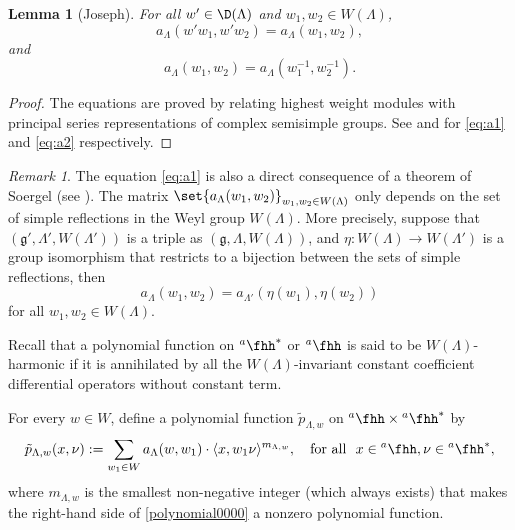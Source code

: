 \documentclass[12pt]{amsart}
\newcommand{\CH}{{\mathcal {H}}}
\newcommand{\g}{\mathfrak g}
\newcommand{\la}{\langle}
\newcommand{\ra}{\rangle}
\newcommand{\be}{\begin {equation}}
\newcommand{\ee}{\end {equation}}
\numberwithin{equation}{section}
\newtheorem{lem}[thm]{Lemma}
\theoremstyle{remark}
\newtheorem{remark}[thm]{Remark}
\def\hha{{}^a\fhh}
\begin{document}
\begin{lem}[Joseph] \label{wprime0}
For all  $w'\in \D(\Lambda)$ and $w_1, w_2\in W(\Lambda)$,
\begin{equation}\label{eq:a1}
a_{\Lambda}(w'w_1, w'w_2)= a_{\Lambda}(w_1, w_2),
\end{equation}
and
\begin{equation}\label{eq:a2}
    a_{\Lambda}(w_1,w_2) = a_{\Lambda}(w_1^{-1}, w_2^{-1}).
\end{equation}
\end{lem}
\begin{proof}
  The equations are  proved by relating highest weight modules with principal series representations of complex semisimple groups.
  See \cite[Theorem~4.12 and Theorem~5.4]{J79D} and \cite[Corollary~3.3]{J79W} for  \eqref{eq:a1} and \eqref{eq:a2} respectively.
\end{proof}

\begin{remark}\label{soergel}
The equation \cref{eq:a1} is also a direct consequence of a theorem of Soergel
(see \cite[Section 2.5, Theorem 11]{Soergel}).
 The matrix   $\set{a_{\Lambda}(w_1, w_2)}_{w_1, w_2\in W(\Lambda)}$ only depends on the set of simple reflections in the Weyl group $W(\Lambda)$.
More precisely, suppose that $(\g', \Lambda',  W(\Lambda'))$ is a triple as
$(\g, \Lambda, W(\Lambda))$, and $\eta: W(\Lambda)\rightarrow W(\Lambda')$ is a group
isomorphism that restricts to a bijection between the sets of  simple reflections, then
\[
a_{\Lambda}(w_1, w_2)=a_{\Lambda'}(\eta(w_1), \eta(w_2))
\]
for all $w_1, w_2\in W(\Lambda)$.
\end{remark}


Recall that a polynomial function on $\hha^*$ or $\hha$ is said to be $W(\Lambda)$-harmonic if it is  annihilated by all the $W(\Lambda)$-invariant constant coefficient differential operators without constant term.


For every $w\in W$, define a polynomial function $\tilde p_{\Lambda, w}$ on $\hha\times \hha^*$ by
\be\label{polynomial0000}
  \tilde p_{\Lambda, w}(x,\nu):= \sum_{w_1\in W} a_{\Lambda}(w, w_1)\cdot  \la x, w_1 \nu\ra^{m_{\Lambda, w}},\quad  \textrm{for all }  \ x\in \hha, \nu\in \hha^*,
\ee
where $m_{\Lambda, w}$ is the smallest non-negative integer (which always exists) that makes the right-hand side of \eqref{polynomial0000} a nonzero polynomial function.
\end{document}
